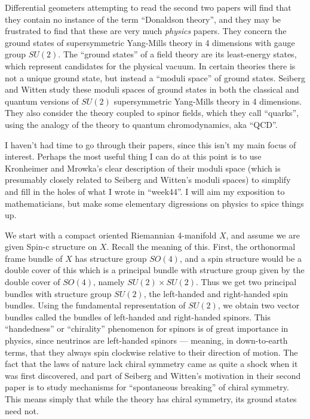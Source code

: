 \documentclass{article}
\begin{document}
Differential geometers attempting to read the second two papers will
find that they contain no instance of the term ``Donaldson theory'', and
they may be frustrated to find that these are very much \emph{physics}
papers. They concern the ground states of supersymmetric Yang-Mills
theory in 4 dimensions with gauge group \(SU(2)\). The ``ground states''
of a field theory are its least-energy states, which represent
candidates for the physical vacuum. In certain theories there is not a
unique ground state, but instead a ``moduli space'' of ground states.
Seiberg and Witten study these moduli spaces of ground states in both
the classical and quantum versions of \(SU(2)\) supersymmetric
Yang-Mills theory in 4 dimensions. They also consider the theory coupled
to spinor fields, which they call ``quarks'', using the analogy of the
theory to quantum chromodynamics, aka ``QCD''.

I haven't had time to go through their papers, since this isn't my main
focus of interest. Perhaps the most useful thing I can do at this point
is to use Kronheimer and Mrowka's clear description of their moduli
space (which is presumably closely related to Seiberg and Witten's
moduli spaces) to simplify and fill in the holes of what I wrote in
``week44''. I will aim my exposition to mathematicians, but make some
elementary digressions on physics to spice things up.

We start with a compact oriented Riemannian 4-manifold \(X\), and assume
we are given Spin-c structure on \(X\). Recall the meaning of this.
First, the orthonormal frame bundle of \(X\) has structure group
\(SO(4)\), and a spin structure would be a double cover of this which is
a principal bundle with structure group given by the double cover of
\(SO(4)\), namely \(SU(2) \times SU(2)\). Thus we get two principal
bundles with structure group \(SU(2)\), the left-handed and right-handed
spin bundles. Using the fundamental representation of \(SU(2)\), we
obtain two vector bundles called the bundles of left-handed and
right-handed spinors. This ``handedness'' or ``chirality'' phenomenon
for spinors is of great importance in physics, since neutrinos are
left-handed spinors --- meaning, in down-to-earth terms, that they
always spin clockwise relative to their direction of motion. The fact
that the laws of nature lack chiral symmetry came as quite a shock when
it was first discovered, and part of Seiberg and Witten's motivation in
their second paper is to study mechanisms for ``spontaneous breaking''
of chiral symmetry. This means simply that while the theory has chiral
symmetry, its ground states need not.
\end{document}
